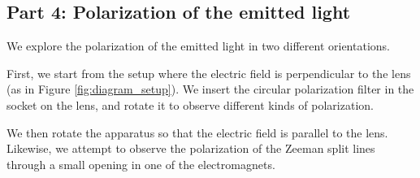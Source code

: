 \subsection{Part 4: Polarization of the emitted light}

We explore the polarization of the emitted light in two different orientations.

First, we start from the setup where the electric field is perpendicular to the lens (as in Figure \ref{fig:diagram_setup}).
We insert the circular polarization filter in the socket on the lens, and rotate it to observe different kinds of polarization.

We then rotate the apparatus so that the electric field is parallel to the lens.
Likewise, we attempt to observe the polarization of the Zeeman split lines through a small opening in one of the electromagnets.